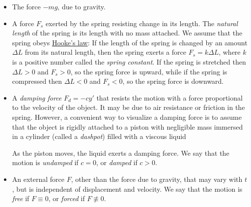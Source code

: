\documentclass{ximera}
\begin{document}
\begin{itemize}
\item The force $-mg$, due to gravity.
 
\item A force $F_s$ exerted by the spring resisting change in its
length. The \textit{natural length} of the spring is its length with no mass attached. We assume that the spring obeys
\href{https://en.wikipedia.org/wiki/Hooke%27s_law}{Hooke's law}:
If the length of the spring is changed by an amount $\Delta L$
from its natural length,  then the spring exerts a force $F_s=k\Delta
L$, where $k$ is a positive number called the \textit{spring constant}.
If the spring is stretched then  $\Delta L>0$ and $F_s>0$, so the
spring force is upward, while if the spring is compressed then $\Delta
L<0$ and $F_s<0$, so the spring force is downward.
 
\item A \textit{damping force} $F_d=-cy'$ that resists the motion with
a force proportional to the velocity of the object. It may be due to
air resistance or friction in the spring. However, a convenient way to
visualize a damping force is to assume that the object is rigidly
attached to a piston with negligible mass immersed in a cylinder
(called a \textit{dashpot}) filled with a viscous liquid

\begin{center}
\end{center}

 
As the piston moves, the liquid exerts a
damping force. We say that the motion is \textit{undamped} if $c=0$, or
\textit{damped} if $c>0$.
 
 
\item An external force $F$, other than the force due to gravity, that
may vary with $t$, but is independent of displacement and velocity. We
say that the motion is \textit{free} if $F\equiv0$, or \textit{forced}
if $F\not\equiv0$.
 
\end{itemize}
 
\end{document}
